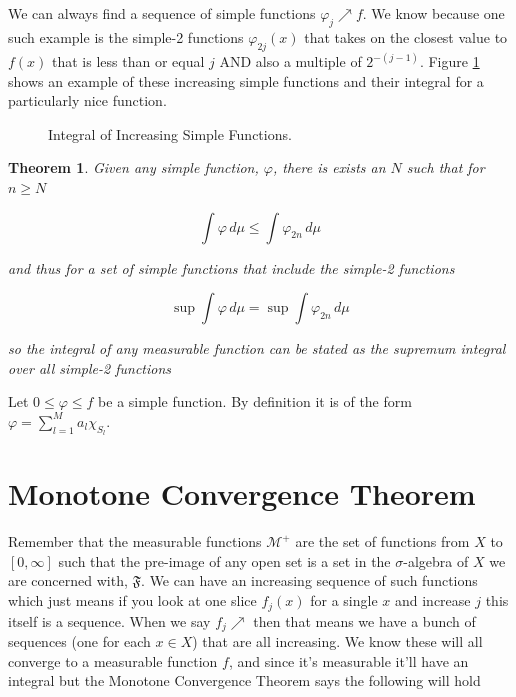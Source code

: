 \documentclass[oneside]{book}
\newtheorem{theorem}{Theorem}[chapter]
\newenvironment{proof}[1][Proof]{\begin{trivlist}
\item[\hskip \labelsep {\bfseries #1}]}{\end{trivlist}}
\begin{document}
We can always find a sequence of simple functions $\varphi_j \nearrow f$. We know because one such example is the simple-2 functions $\varphi_{2j}(x)$ that takes on the closest value to $f(x)$ that is less than or equal $j$ AND also a multiple of $2^{-(j-1)}$. Figure \ref{fig:increasingSimpleFunctions} shows an example of these increasing simple functions and their integral for a particularly nice function.

\begin{figure}[h]
    \centering
    \caption{Integral of Increasing Simple Functions.}
    \label{fig:increasingSimpleFunctions}
\end{figure}

\begin{theorem}
Given any simple function, $\varphi$, there is exists an $N$ such that for $n \ge N$

\begin{equation}
\int \varphi\, d\mu \le \int \varphi_{2n}\, d\mu
\end{equation}

and thus for a set of simple functions that include the simple-2 functions

\begin{equation}
\sup \int \varphi\, d\mu = \sup \int \varphi_{2n}\, d\mu
\end{equation}

so the integral of any measurable function can be stated as the supremum integral over all simple-2 functions
\end{theorem}

\begin{proof}
Let $0 \le \varphi \le f$ be a simple function. By definition it is of the form $\varphi = \sum_{l=1}^M a_l \chi_{S_l}$.
\end{proof}


\section{Monotone Convergence Theorem}
Remember that the measurable functions $\mathcal{M}^+$ are the set of functions from $X$ to $[0,\infty]$ such that the pre-image of any open set is a set in the $\sigma$-algebra of $X$ we are concerned with, $\mathfrak{F}$. We can have an increasing sequence of such functions which just means if you look at one slice $f_j(x)$ for a single $x$ and increase $j$ this itself is a sequence. When we say $f_j \nearrow$ then that means we have a bunch of sequences (one for each $x \in X$) that are all increasing. We know these will all converge to a measurable function $f$, and since it's measurable it'll have an integral but the Monotone Convergence Theorem says the following will hold
\end{document}
